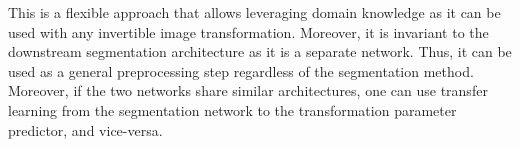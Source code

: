 This is a flexible approach that allows leveraging domain knowledge as it can be used with any invertible image transformation. Moreover, it is invariant to the downstream segmentation architecture as it is a separate network. Thus, it can be used as a general preprocessing step regardless of the segmentation method. Moreover, if the two networks share similar architectures, one can use transfer learning from the segmentation network to the transformation parameter predictor, and vice-versa.


